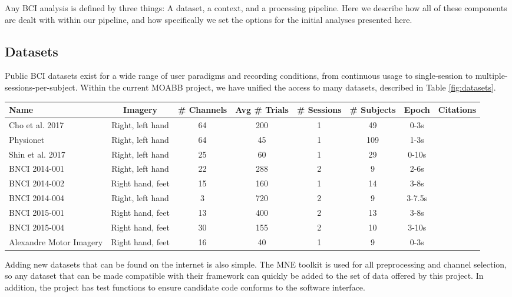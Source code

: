 Any BCI analysis is defined by three things: A dataset, a context, and
a processing pipeline. Here we describe how all of these components
are dealt with within our pipeline, and how specifically we set the
options for the initial analyses presented here.

\subsection{Datasets}

Public BCI datasets exist for a wide range of user paradigms and
recording conditions, from continuous usage to single-session to
multiple-sessions-per-subject. Within the current MOABB project, we
have unified the access to many datasets, described in Table
\ref{fig:datasets}.


\begin{table*}[ht]
  \centering
  \begin{tabular}{l || c | c | c | c | c | c | c }
    Name & Imagery & \# Channels & Avg \# Trials & \# Sessions & \# Subjects & Epoch & Citations \\ \hline
    Cho et al. 2017 & Right, left hand & 64 & 200 & 1 & 49 & 0-3s & \cite{Cho2017} \\
    Physionet & Right, left hand & 64 & 45 & 1 & 109 & 1-3s & \cite{Schalk2004, Goldberger2000} \\
    Shin et al. 2017 & Right, left hand & 25 & 60 & 1 & 29 & 0-10s & \cite{Blankertz2007, Shin2017} \\
    BNCI 2014-001 & Right, left hand & 22 & 288 & 2 & 9 & 2-6s & \cite{Tangermann2012} \\
    BNCI 2014-002 & Right hand, feet & 15 & 160 & 1 & 14 & 3-8s & \cite{Steyrl2016a} \\
    BNCI 2014-004 & Right, left hand & 3 & 720 & 2 & 9 & 3-7.5s & \cite{Leeb2007} \\
    BNCI 2015-001 & Right hand, feet & 13 & 400 & 2 & 13 & 3-8s & \cite{Faller2012} \\
    BNCI 2015-004 & Right hand, feet & 30 & 155 & 2 & 10 & 3-10s & \cite{Scherer2015} \\
    Alexandre Motor Imagery & Right hand, feet & 16 & 40 & 1 & 9 & 0-3s & \cite{Barachant2012a}\\
    
\end{tabular}
    \caption{Dataset attributes}
    \label{fig:datasets}
\end{table*}

Adding new datasets that can be found on the internet is also
simple. The MNE toolkit\cite{Gramfort2014,Gramfort2013} is used for
all preprocessing and channel selection, so any dataset that can be
made compatible with their framework can quickly be added to the set
of data offered by this project. In addition, the project has test
functions to ensure candidate code conforms to the software interface.

